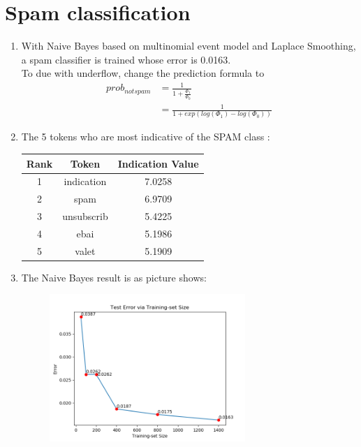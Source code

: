 \documentclass[12pt]{article}
\begin{document}
    \section*{Spam classification}
    \begin{enumerate}[label=(\alph*)]
        \item With Naive Bayes based on multinomial event model and Laplace Smoothing, a spam classifier is trained whose error is 0.0163.
        \\ To due with underflow, change the prediction formula to 
        \begin{equation*}
            \begin{split}
                prob_{notspam} &= \frac{1}{1+\frac{\Phi_1}{\Phi_0}} \\
                &=  \frac{1}{1+exp(log(\Phi_1)-log(\Phi_0))} 
            \end{split}
        \end{equation*}
        \item The 5 tokens who are most indicative of the SPAM class :\\
        \begin{table}[h]
            \centering
            \begin{tabular}{c c c}
                Rank & Token & Indication Value \\
                \hline
                1 & indication & 7.0258 \\
                2 & spam & 6.9709 \\
                3 & unsubscrib & 5.4225 \\
                4 & ebai & 5.1986 \\
                5 & valet & 5.1909 \\
                \end{tabular}
        \end{table}
        \newpage 
        \item The Naive Bayes result is as picture shows:
        \begin{figure}[H]
            \centering
            \includegraphics[width=0.70\textwidth]{Q6/nb_error.png}

\end{figure}
\end{enumerate}
\end{document}
